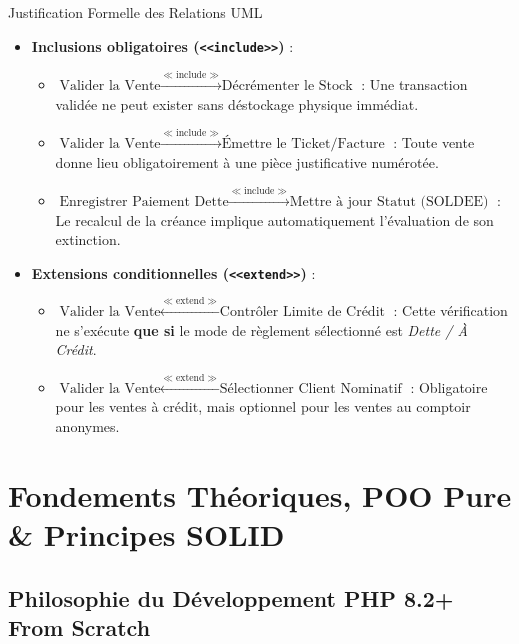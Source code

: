 \documentclass[11pt,a4paper,titlepage,twoside,openright]{report}
\begin{document}
\begin{metierbox}{Justification Formelle des Relations UML}
\begin{itemize}
    \item \textbf{Inclusions obligatoires (\texttt{<<include>>})} :
    \begin{itemize}
        \item $\text{Valider la Vente} \xrightarrow{\ll\text{include}\gg} \text{Décrémenter le Stock}$ : Une transaction validée ne peut exister sans déstockage physique immédiat.
        \item $\text{Valider la Vente} \xrightarrow{\ll\text{include}\gg} \text{Émettre le Ticket/Facture}$ : Toute vente donne lieu obligatoirement à une pièce justificative numérotée.
        \item $\text{Enregistrer Paiement Dette} \xrightarrow{\ll\text{include}\gg} \text{Mettre à jour Statut (SOLDEE)}$ : Le recalcul de la créance implique automatiquement l'évaluation de son extinction.
    \end{itemize}
    \item \textbf{Extensions conditionnelles (\texttt{<<extend>>})} :
    \begin{itemize}
        \item $\text{Valider la Vente} \xleftarrow{\ll\text{extend}\gg} \text{Contrôler Limite de Crédit}$ : Cette vérification ne s'exécute \textbf{que si} le mode de règlement sélectionné est \emph{Dette / À Crédit}.
        \item $\text{Valider la Vente} \xleftarrow{\ll\text{extend}\gg} \text{Sélectionner Client Nominatif}$ : Obligatoire pour les ventes à crédit, mais optionnel pour les ventes au comptoir anonymes.
    \end{itemize}
\end{itemize}
\end{metierbox}

\chapter{Fondements Théoriques, POO Pure \& Principes SOLID}

\section{Philosophie du Développement PHP 8.2+ From Scratch}
\end{document}
